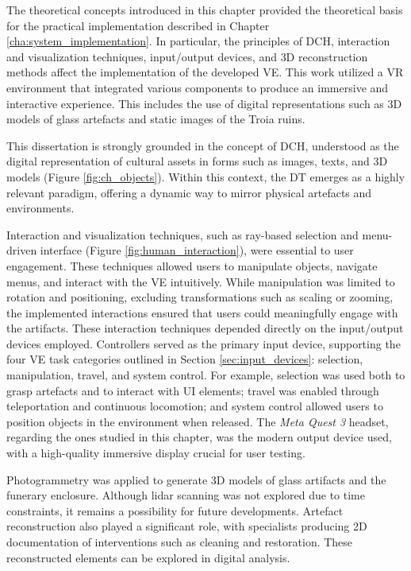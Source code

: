 The theoretical concepts introduced in this chapter provided the theoretical basis for the practical implementation described in Chapter \ref{cha:system_implementation}.
In particular, the principles of \gls{DCH}, interaction and visualization techniques, input/output devices, and \gls{3D} reconstruction methods affect the implementation of the developed \gls{VE}. This work utilized a \gls{VR} environment that integrated various components to produce an immersive and interactive experience. 
This includes the use of digital representations such as \gls{3D} models of glass artefacts and static images of the Troia ruins.  

This dissertation is strongly grounded in the concept of \gls{DCH}, understood as the digital representation of cultural assets in forms such as images, texts, and \gls{3D} models (Figure \ref{fig:ch_objects}). 
Within this context, the \gls{DT} emerges as a highly relevant paradigm, offering a dynamic way to mirror physical artefacts and environments. 

Interaction and visualization techniques, such as ray-based selection and menu-driven interface (Figure \ref{fig:human_interaction}), were essential to user engagement. These techniques allowed users to manipulate objects, navigate menus, and interact with the \gls{VE} intuitively. While manipulation was limited to rotation and positioning, excluding transformations such as scaling or zooming, the implemented interactions ensured that users could meaningfully engage with the artifacts.
These interaction techniques depended directly on the input/output devices employed. Controllers served as the primary input device, supporting the four \gls{VE} task categories outlined in Section \ref{sec:input_devices}: selection, manipulation, travel, and system control. For example, selection was used both to grasp artefacts and to interact with \gls{UI} elements; travel was enabled through teleportation and continuous locomotion; and system control allowed users to position objects in the environment when released. 
The \emph{Meta Quest 3} headset, regarding the ones studied in this chapter, was the modern output device used, with a high-quality immersive display crucial for user testing.

Photogrammetry was applied to generate \gls{3D} models of glass artifacts and the funerary enclosure. Although \gls{lidar} scanning was not explored due to time constraints, it remains a possibility for future developments. Artefact reconstruction also played a significant role, with specialists producing \gls{2D} documentation of interventions such as cleaning and restoration. These reconstructed elements can be explored in digital analysis.

